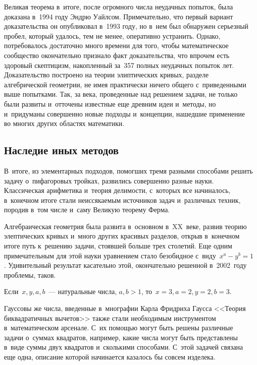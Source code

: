 \documentclass{article}
\begin{document}
Великая теорема в~итоге, после огромного числа неудачных попыток, была доказана
в~1994 году Эндрю Уайлсом. Примечательно, что первый вариант доказательства
он опубликовал в~1993 году, но в~нем был обнаружен серьезный пробел, который
удалось, тем не менее, оперативно устранить. Однако, потребовалось достаточно
много времени для того, чтобы математическое сообщество окончательно признало
факт доказательства, что впрочем есть здоровый скептицизм, накопленный
за~357 полных неудачных попыток лет. Доказательство построено на теории
элиптических кривых, разделе алгебрической геометрии, не имея практически ничего
общего с~приведенными выше попытками. Так, за века, проведенные над решением
задачи, не только были развиты и~отточены известные еще древним идеи и~методы,
но и~придуманы совершенно новые подходы и~концепции, нашедшие применение во
многих других областях математики.

\subsection{Наследие иных методов}

В~итоге, из элементарных подходов, помогших тремя разными способами решить
задачу о~пифагоровых тройках, развились совершенно разные науки. Классическая
арифметика и~теория делимости, с~которых все начиналось, в~конечном итоге стали
неиссякаемым источников задач и~различных техник, породив в~том числе и~саму
Великую теорему Ферма.

Алгебраическая геометрия была развита в~основном в~XX~веке, развив теорию
элептических кривых и~много других красивых разделов, открыв в~конечном итоге
путь к~решению задачи, стоявшей больше трех столетий. Еще одним примечательным
для этой науки уравнением стало безобидное с~виду~$x^a - y^b = 1$. Удивительный
результат касательно этой, окончательно решенной в~2002~году проблемы, таков.

\begin{claim}
  Если~$x, y, a, b$~--- натуральные числа, $a, b > 1$,
  то~$x = 3, a = 2, y = 2, b = 3$.
\end{claim}

Гауссовы же числа, введенные в~мнографии Карла Фридриха Гаусса <<Теория
биквадратичных вычетов>> также стали необходимым инструментом в~математическом
арсенале. С~их помощью могут быть решены различные задачи о~суммах квадратов,
например, какие числа могут быть представлены в~виде суммы двух квадратов
и~сколькими способами. С~этой задачей связана еще одна, описание которой
начинается казалось бы совсем изделека.
\end{document}
